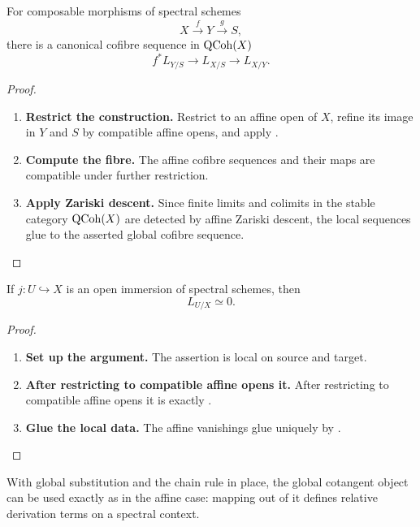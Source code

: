 \begin{theorem}
\label{thm:global-cotangent-transitivity}
For composable morphisms of spectral schemes
\[
    X\xrightarrow{f}Y\xrightarrow{g}S,
\]
there is a canonical cofibre sequence in \(\operatorname{QCoh}(X)\)
\[
    f^*L_{Y/S}
    \longrightarrow
    L_{X/S}
    \longrightarrow
    L_{X/Y}.
\]
\end{theorem}

\begin{proof}
\leavevmode
\begin{enumerate}[label=\textup{(\arabic*)}]
    \item \textbf{Restrict the construction.}
    Restrict to an affine open of \(X\), refine its image in \(Y\) and \(S\)
    by compatible affine opens, and apply .

    \item \textbf{Compute the fibre.}
    The affine cofibre sequences and their maps are compatible under further restriction.

    \item \textbf{Apply Zariski descent.}
    Since finite limits and colimits in the stable category \(\operatorname{QCoh}(X)\) are detected by affine
    Zariski descent, the local sequences glue to the asserted global cofibre sequence.
\end{enumerate}
\end{proof}

\begin{corollary}
\label{cor:cotangent-open-zero}
If \(j:U\hookrightarrow X\) is an open immersion of spectral schemes, then
\[
    L_{U/X}\simeq0.
\]
\end{corollary}

\begin{proof}
\leavevmode
\begin{enumerate}[label=\textup{(\arabic*)}]
    \item \textbf{Set up the argument.}
    The assertion is local on source and target.

    \item \textbf{After restricting to compatible affine opens it.}
    After restricting to compatible affine opens it is exactly
    .

    \item \textbf{Glue the local data.}
    The affine vanishings glue uniquely by .
\end{enumerate}
\end{proof}
With global substitution and the chain rule in place, the global cotangent
object can be used exactly as in the affine case: mapping out of it defines
relative derivation terms on a spectral context.

